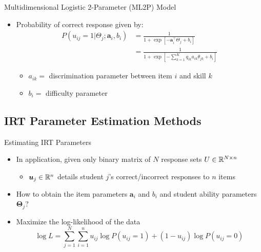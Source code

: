 \documentclass{beamer}
\def \R{\ensuremath \mathbb{R}}
\newcommand{\vect}[1]{\boldsymbol{#1}}
\theoremstyle{definition}
\begin{document}
\begin{frame}{Multidimensional Logistic 2-Parameter (ML2P) Model}
\begin{itemize}
\item Probability of correct response given by:
  \begin{align*}
  P(u_{ij}=1 | \Theta_j; \vect a_i, b_i) &= \frac{1}{1+\exp\left[-\vect a_i^\top \Theta_j + b_i\right]} \\
  &= \frac{1}{1 + \exp[-\sum_{k=1}^K q_{ik}a_{ik}\theta_{jk} + b_i]}
\end{align*}
  \begin{itemize}
    \item<2-> $a_{ik} =$ discrimination parameter between item $i$ and skill $k$ 
    \item<2-> $b_i =$ difficulty parameter
  \end{itemize}
\end{itemize}
\end{frame}

\subsection{IRT Parameter Estimation Methods}

\begin{frame}{Estimating IRT Parameters}
  \begin{itemize}
    \item In application, given only binary matrix of $N$ response sets $U \in \R^{N\times n}$
      \begin{itemize}
        \item $\vect u_j \in \R^n$ details student $j$'s correct/incorrect responses to $n$ items
      \end{itemize}
    \item How to obtain the item parameters $\vect a_i$ and $b_i$ and student ability parameters $\vect \Theta_j$?
    \item Maximize the log-likelihood of the data
      \[\log L = \sum_{j=1}^N \sum_{i=1}^n u_{ij}\log P(u_{ij} = 1) + (1-u_{ij})\log P(u_{ij}=0)\]
  \end{itemize}
\end{frame}
\end{document}
